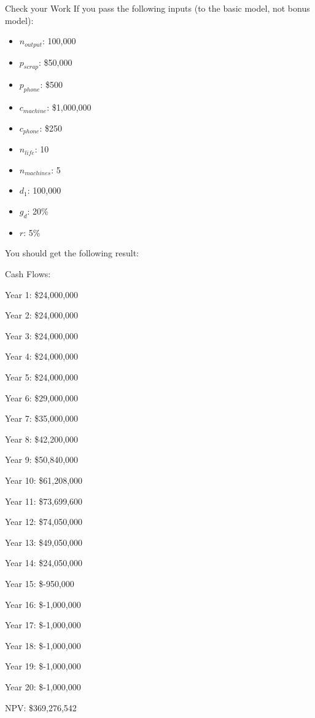 \documentclass[]{article}
\begin{document}
\begin{section}{Check your Work}
If you pass the following inputs (to the basic model, not bonus model): 
\begin{itemize}
\item $n_{output}$: 100,000
\item $p_{scrap}$: \$50,000
\item $p_{phone}$: \$500
\item $c_{machine}$: \$1,000,000
\item $c_{phone}$: \$250
\item $n_{life}$: 10
\item $n_{machines}$: 5
\item $d_1$: 100,000
\item $g_d$: 20\%
\item $r$: 5\%
\end{itemize}
You should get the following result:

                Cash Flows:

Year 1: \$24,000,000

Year 2: \$24,000,000

Year 3: \$24,000,000

Year 4: \$24,000,000

Year 5: \$24,000,000

Year 6: \$29,000,000

Year 7: \$35,000,000

Year 8: \$42,200,000

Year 9: \$50,840,000

Year 10: \$61,208,000

Year 11: \$73,699,600

Year 12: \$74,050,000

Year 13: \$49,050,000

Year 14: \$24,050,000

Year 15: \$-950,000

Year 16: \$-1,000,000

Year 17: \$-1,000,000

Year 18: \$-1,000,000

Year 19: \$-1,000,000

Year 20: \$-1,000,000



NPV: \$369,276,542
                
\label{check-work}
\end{section}
\end{document}
